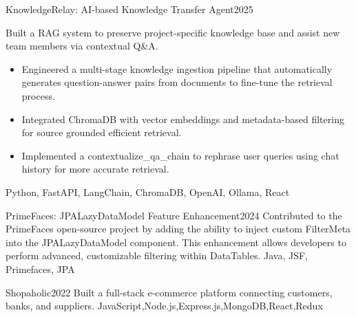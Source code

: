 %
%
%


\begin{projects}
        \project
        {KnowledgeRelay: AI-based Knowledge Transfer Agent}{2025}
        {}
        	{
            Built a RAG system to preserve project-specific knowledge base and assist new team members via contextual Q\&A.
              \begin{itemize}
                    \item Engineered a multi-stage knowledge ingestion pipeline that automatically generates question-answer pairs from documents to fine-tune the retrieval process.

                    \item Integrated ChromaDB with vector embeddings and metadata-based filtering for source grounded efficient retrieval.
                    
                    \item Implemented a contextualize\_qa\_chain to rephrase user queries using chat history for more accurate retrieval.
              \end{itemize}
}
	{Python, FastAPI, LangChain, ChromaDB, OpenAI, Ollama, React}



        \project
        {PrimeFaces: JPALazyDataModel Feature Enhancement}{2024}
        {}
        	{Contributed to the PrimeFaces open-source project by adding the ability to inject custom FilterMeta into the JPALazyDataModel component. This enhancement allows developers to perform advanced, customizable filtering within DataTables.}
	{Java, JSF, Primefaces, JPA}

    
	\project
	{Shopaholic}{2022}
        {}
        	{Built a full-stack e-commerce platform connecting customers, banks, and suppliers.}
	{JavaScript,Node.js,Express.js,MongoDB,React,Redux}
 

\end{projects}
